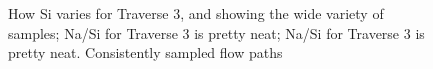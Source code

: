 \begin{figure}[h]
    \caption{How Si varies for Traverse 3, and showing the wide variety of samples; Na/Si for Traverse 3 is pretty neat; Na/Si for Traverse 3 is pretty neat. Consistently sampled flow paths}
    \label{fig:spatial_changes_spring8}
\end{figure}

\FloatBarrier






